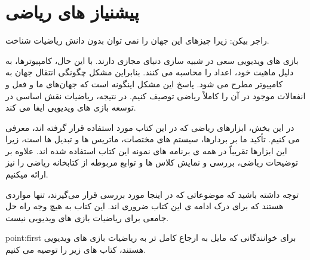 \newpage

\part{پیشنیاز های ریاضی}
{
    \Large
    \begin{spacing}{1.4}
        \textbf{\vspace{3pt}}
        \begin{displayquote}
            راجر بیکن: زیرا چیزهای این جهان را نمی توان بدون دانش ریاضیات شناخت.
            \begin{flushleft}
            \end{flushleft}
        \end{displayquote}
        \textbf{\vspace{3pt}}

        بازی های ویدیویی سعی در شبیه سازی دنیای مجازی دارند.
        با این حال، کامپیوترها، به دلیل ماهیت خود، اعداد را محاسبه می کنند. بنابراین مشکل چگونگی انتقال جهان به کامپیوتر مطرح می شود.
        پاسخ این مشکل اینگونه است که جهان‌های ما و فعل و انفعالات موجود در آن را کاملاً ریاضی توصیف کنیم.
        در نتیجه، ریاضیات نقش اساسی در توسعه بازی های ویدیویی ایفا می کند.

        در این بخش، ابزارهای ریاضی که در این کتاب مورد استفاده قرار گرفته اند، معرفی می کنیم. تأکید ما بر بردارها، سیستم های مختصات، ماتریس ها و تبدیل ها است، زیرا این ابزارها تقریباً در همه ی برنامه های نمونه این کتاب استفاده شده اند.
        علاوه بر توضیحات ریاضی، بررسی و نمایش کلاس ها و توابع مربوطه از کتابخانه ریاضی  را نیز ارائه میکنیم.

        توجه داشته باشید که موضوعاتی که در اینجا مورد بررسی قرار می‌گیرند، تنها مواردی هستند که برای درک ادامه ی این کتاب ضروری اند.
        این کتاب به هیچ وجه راه حل جامعی برای ریاضیات بازی های ویدیویی نیست.

        \begin{point}{point:first}
            \Large
            برای خوانندگانی که مایل به ارجاع کامل تر به ریاضیات بازی های ویدیویی هستند، کتاب های زیر را توصیه می کنیم.
            \textbf{\vspace{-20pt}}
        \end{point}


\end{spacing}}
